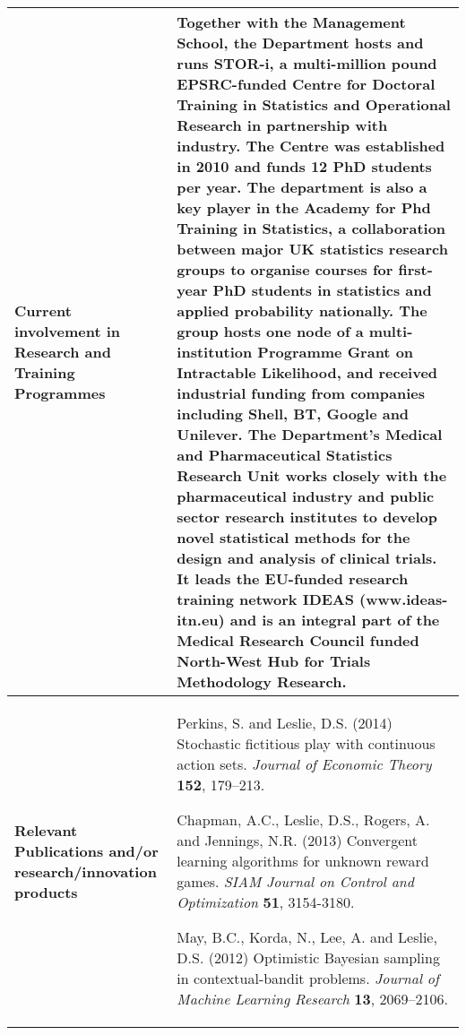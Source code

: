 \documentclass[a4paper,11pt]{article}
\begin{document}
{\begin{tabular}{>{\raggedright}p{}p{}}
\\\midrule
\textbf{Current involvement in Research and Training Programmes} &
Together with the Management School, the Department hosts and runs STOR-i, a
multi-million pound EPSRC-funded Centre for Doctoral Training in
Statistics and Operational Research in partnership with industry.  The
Centre was established in 2010 and funds 12 PhD students per year.  The department is also a key player in the Academy for Phd Training in Statistics, a collaboration between major UK statistics research groups to organise courses for first-year PhD students in statistics and applied probability nationally.  The group hosts one node of a multi-institution Programme Grant on Intractable Likelihood, and received industrial funding from companies including Shell, BT, Google and Unilever. The
Department's Medical and Pharmaceutical Statistics Research Unit
works closely with the pharmaceutical
industry and public sector research institutes to develop novel
statistical methods for the design and analysis of clinical trials. It
leads the EU-funded research training network IDEAS (www.ideas-itn.eu) and
is an integral part of the Medical Research Council funded North-West Hub for Trials
Methodology Research.
\\\midrule
\textbf{Relevant Publications and/or research/innovation products} &

 Perkins, S. and Leslie, D.S. (2014)  Stochastic fictitious play with continuous action sets. {\em Journal of Economic Theory} {\bf 152}, 179--213.

Chapman, A.C., Leslie, D.S., Rogers, A. and Jennings, N.R. (2013) Convergent learning algorithms for unknown reward games. {\em SIAM Journal on Control and Optimization} {\bf 51}, 3154-3180.


May, B.C., Korda, N., Lee, A. and Leslie, D.S. (2012) Optimistic Bayesian sampling in contextual-bandit problems. {\em Journal of Machine Learning Research} {\bf 13}, 2069--2106.



\end{tabular}}
\end{document}
